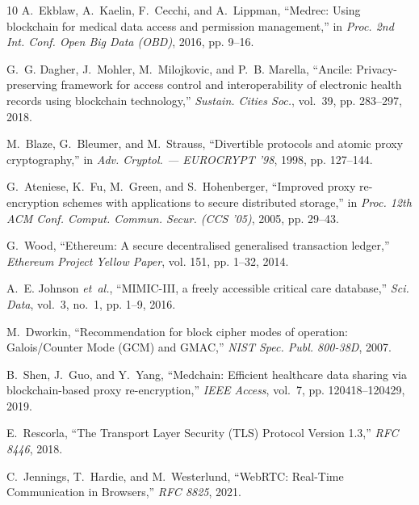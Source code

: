 \documentclass[journal,10pt,twocolumn]{IEEEtran}
\begin{document}

\begin{thebibliography}{10}
A.~Ekblaw, A.~Kaelin, F.~Cecchi, and A.~Lippman, ``Medrec: Using blockchain for medical data access and permission management,'' in \emph{Proc. 2nd Int. Conf. Open Big Data (OBD)}, 2016, pp. 9--16.

G.~G. Dagher, J.~Mohler, M.~Milojkovic, and P.~B. Marella, ``Ancile: Privacy-preserving framework for access control and interoperability of electronic health records using blockchain technology,'' \emph{Sustain. Cities Soc.}, vol.~39, pp. 283--297, 2018.

M.~Blaze, G.~Bleumer, and M.~Strauss, ``Divertible protocols and atomic proxy cryptography,'' in \emph{Adv. Cryptol. --- EUROCRYPT '98}, 1998, pp. 127--144.

G.~Ateniese, K.~Fu, M.~Green, and S.~Hohenberger, ``Improved proxy re-encryption schemes with applications to secure distributed storage,'' in \emph{Proc. 12th ACM Conf. Comput. Commun. Secur. (CCS '05)}, 2005, pp. 29--43.

G.~Wood, ``Ethereum: A secure decentralised generalised transaction ledger,'' \emph{Ethereum Project Yellow Paper}, vol. 151, pp. 1--32, 2014.

A.~E. Johnson \emph{et~al.}, ``MIMIC-III, a freely accessible critical care database,'' \emph{Sci. Data}, vol.~3, no.~1, pp. 1--9, 2016.

M.~Dworkin, ``Recommendation for block cipher modes of operation: Galois/Counter Mode (GCM) and GMAC,'' \emph{NIST Spec. Publ. 800-38D}, 2007.

B.~Shen, J.~Guo, and Y.~Yang, ``Medchain: Efficient healthcare data sharing via blockchain-based proxy re-encryption,'' \emph{IEEE Access}, vol.~7, pp. 120418--120429, 2019.

E.~Rescorla, ``The Transport Layer Security (TLS) Protocol Version 1.3,'' \emph{RFC 8446}, 2018.

C.~Jennings, T.~Hardie, and M.~Westerlund, ``WebRTC: Real-Time Communication in Browsers,'' \emph{RFC 8825}, 2021.
\end{thebibliography}
\end{document}
